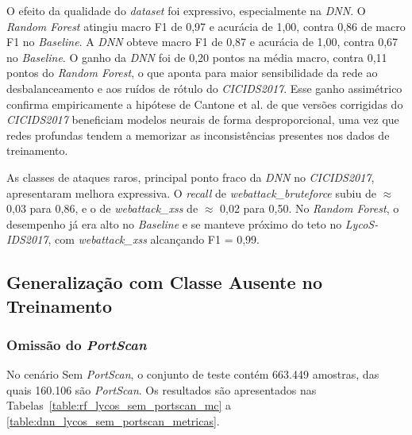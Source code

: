 

O efeito da qualidade do \textit{dataset} foi expressivo, especialmente na \textit{DNN}. O \textit{Random Forest} atingiu macro F1 de 0,97 e acurácia de 1,00, contra 0,86 de macro F1 no \textit{Baseline}. A \textit{DNN} obteve macro F1 de 0,87 e acurácia de 1,00, contra 0,67 no \textit{Baseline}. O ganho da \textit{DNN} foi de 0,20 pontos na média macro, contra 0,11 pontos do \textit{Random Forest}, o que aponta para maior sensibilidade da rede ao desbalanceamento e aos ruídos de rótulo do \textit{CICIDS2017}. Esse ganho assimétrico confirma empiricamente a hipótese de Cantone et al. \cite{cantone2024} de que versões corrigidas do \textit{CICIDS2017} beneficiam modelos neurais de forma desproporcional, uma vez que redes profundas tendem a memorizar as inconsistências presentes nos dados de treinamento.

As classes de ataques raros, principal ponto fraco da \textit{DNN} no \textit{CICIDS2017}, apresentaram melhora expressiva. O \textit{recall} de \textit{webattack\_bruteforce} subiu de $\approx$ 0,03 para 0,86, e o de \textit{webattack\_xss} de $\approx$ 0,02 para 0,50. No \textit{Random Forest}, o desempenho já era alto no \textit{Baseline} e se manteve próximo do teto no \textit{LycoS-IDS2017}, com \textit{webattack\_xss} alcançando F1 = 0,99.

\subsection{Generalização com Classe Ausente no Treinamento}

\subsubsection{Omissão do \textit{PortScan}}

No cenário Sem \textit{PortScan}, o conjunto de teste contém 663.449 amostras, das quais 160.106 são \textit{PortScan}. Os resultados são apresentados nas Tabelas~\ref{table:rf_lycos_sem_portscan_mc} a \ref{table:dnn_lycos_sem_portscan_metricas}.







